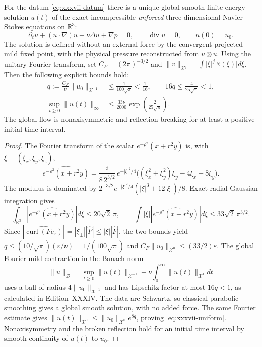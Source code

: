 \begin{theorem}
\label{thm:xxxvii-global}
For the datum \eqref{eq:xxxvii-datum} there is
a unique global smooth finite-energy solution $u(t)$
of the exact incompressible \emph{unforced}
three-dimensional Navier--Stokes equations on $\mathbb R^3$:
\[
\partial_tu+(u\cdot\nabla)u-\nu\Delta u+\nabla p=0,
\qquad \operatorname{div}u=0,\qquad u(0)=u_0.
\]
The solution is defined without an external force
by the convergent projected mild fixed point, with
the physical pressure reconstructed from $u\otimes u$.
Using the unitary Fourier transform, set
$C_F=(2\pi)^{-3/2}$ and
$\|v\|_{\mathcal X^j}=\int|\xi|^j|\widehat v(\xi)|d\xi$.
Then the following explicit bounds hold:
\begin{align}
q:=\frac{C_F}{\nu}\|u_0\|_{\mathcal X^{-1}}
&\le\frac{1}{100\sqrt\pi}<\frac1{16},
\qquad 16q\le\frac4{25\sqrt\pi}<1,
\label{eq:xxxvii-critical}\\
\sup_{t\ge0}\|u(t)\|_\infty
&\le\frac{33\nu}{2000}
\exp\left(\frac2{25\sqrt\pi}\right).
\label{eq:xxxvii-uniform}
\end{align}
The global flow is nonaxisymmetric and
reflection-breaking for at least a positive
initial time interval.
\end{theorem}
\begin{proof}
The Fourier transform of the scalar
$e^{-\rho^2}(x+r^2y)$ is, with
$\xi=(\xi_x,\xi_y,\xi_z)$,
\[
\widehat{e^{-\rho^2}(x+r^2y)}
=\frac{i}{8\,2^{3/2}}\,
e^{-|\xi|^2/4}
\bigl((\xi_x^2+\xi_y^2)\xi_y
       -4\xi_x-8\xi_y\bigr).
\]
The modulus is dominated by
$2^{-3/2}e^{-|\xi|^2/4}
(|\xi|^3+12|\xi|)/8$.
Exact radial Gaussian integration gives
\[
\int_{\mathbb R^3}
\left|\widehat{e^{-\rho^2}(x+r^2y)}\right|d\xi
\le20\sqrt2\,\pi,\qquad
\int|\xi|
\left|\widehat{e^{-\rho^2}(x+r^2y)}\right|d\xi
\le33\sqrt2\,\pi^{3/2}.
\]
Since
$|\widehat{\operatorname{curl}(F e_z)}|
=|\xi_\perp||\widehat F|\le|\xi||\widehat F|$,
the two bounds yield
$q\le (10/\sqrt\pi)(\varepsilon/\nu)
=1/(100\sqrt\pi)$ and
$C_F\|u_0\|_{\mathcal X^0}
\le(33/2)\varepsilon$.
The global Fourier mild contraction in the
Banach norm
\[
\|u\|_{\mathscr B}
=\sup_{t\ge0}\|u(t)\|_{\mathcal X^{-1}}
+\nu\int_0^\infty\|u(t)\|_{\mathcal X^1}dt
\]
uses a ball of radius
$4\|u_0\|_{\mathcal X^{-1}}$
and has Lipschitz factor at most $16q<1$,
as calculated in Edition~XXXIV.
The data are Schwartz, so classical
parabolic smoothing gives a global smooth solution,
with no added force. The same Fourier estimate gives
$\|u(t)\|_{\mathcal X^0}\le
\|u_0\|_{\mathcal X^0}e^{8q}$,
proving \eqref{eq:xxxvii-uniform}.
Nonaxisymmetry and the broken reflection
hold for an initial time interval by smooth
continuity of $u(t)$ to $u_0$.
\end{proof}


